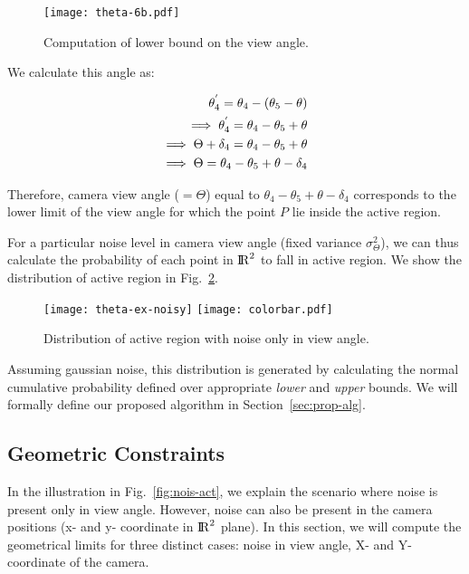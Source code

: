 \begin{figure}[htb]
\centering
\texttt{[image: theta-6b.pdf]} 
\caption{Computation of lower bound on the view angle.}
\label{fig:low-bnd}
\end{figure}

We calculate this angle as:

\begin{equation}
\centering
\begin{aligned}
\theta_4^{'} = \theta_4 - (\theta_5 - \theta)\\
\implies \theta_4^{'} = \theta_4 - \theta_5 + \theta\\
\implies \Theta + \delta_4 = \theta_4 - \theta_5 + \theta\\
\implies \Theta  = \theta_4 - \theta_5 + \theta - \delta_4\\
\end{aligned}
\end{equation}

Therefore, camera view angle ($=\Theta$) equal to $\theta_4 - \theta_5 + \theta - \delta_4$ corresponds to the lower limit of the view angle for which the point $P$ lie inside the active region.

For a particular noise level in camera view angle (fixed variance $\sigma_\Theta^2$), we can thus calculate the probability of each point in ${\rm I\!R}^{2}$ to fall in active region. We show the distribution of active region in Fig.~\ref{fig:dist-actr}. 

\begin{figure}[htb]
\centering
\texttt{[image: theta-ex-noisy]} 
\texttt{[image: colorbar.pdf]}
\caption{Distribution of active region with noise only in view angle.}
\label{fig:dist-actr}
\end{figure}

Assuming gaussian noise, this distribution is generated by calculating the normal cumulative probability defined over appropriate \emph{lower} and \emph{upper} bounds. We will formally define our proposed algorithm in Section~\ref{sec:prop-alg}.

\subsection{Geometric Constraints}
In the illustration in Fig.~\ref{fig:nois-act}, we explain the scenario where noise is present only in view angle. However, noise can also be present in the camera positions (x- and y- coordinate in ${\rm I\!R}^{2}$ plane). In this section, we will compute the geometrical limits for three distinct cases: noise in view angle, X- and Y- coordinate of the camera.

